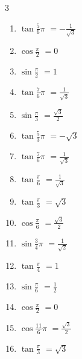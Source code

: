 \begin{multicols}{3}
\begin{enumerate}
  \item $\displaystyle \tan{\frac{5}{6}\pi}$
        $\displaystyle =-\frac{1}{\sqrt{3}}$

  \item $\displaystyle \cos{\frac{\pi}{2}}$
        $\displaystyle =0$

  \item $\displaystyle \sin{\frac{\pi}{2}}$
        $\displaystyle =1$

  \item $\displaystyle \tan{\frac{7}{6}\pi}$
        $\displaystyle =\frac{1}{\sqrt{3}}$

  \item $\displaystyle \sin{\frac{\pi}{3}}$
        $\displaystyle =\frac{\sqrt{3}}{2}$

  \item $\displaystyle \tan{\frac{5}{3}\pi}$
        $\displaystyle =-\sqrt{3}$

  \item $\displaystyle \tan{\frac{7}{6}\pi}$
        $\displaystyle =\frac{1}{\sqrt{3}}$

  \item $\displaystyle \tan{\frac{\pi}{6}}$
        $\displaystyle =\frac{1}{\sqrt{3}}$

  \item $\displaystyle \tan{\frac{\pi}{3}}$
        $\displaystyle =\sqrt{3}$

  \item $\displaystyle \cos{\frac{\pi}{6}}$
        $\displaystyle =\frac{\sqrt{3}}{2}$

\columnbreak %

\resetques

  \item $\displaystyle \sin{\frac{3}{4}\pi}$
        $\displaystyle =\frac{1}{\sqrt{2}}$

  \item $\displaystyle \tan{\frac{\pi}{4}}$
        $\displaystyle =1$

  \item $\displaystyle \sin{\frac{\pi}{6}}$
        $\displaystyle =\frac{1}{2}$

  \item $\displaystyle \cos{\frac{\pi}{2}}$
        $\displaystyle =0$

  \item $\displaystyle \cos{\frac{11}{6}\pi}$
        $\displaystyle =\frac{\sqrt{3}}{2}$

  \item $\displaystyle \tan{\frac{\pi}{3}}$
        $\displaystyle =\sqrt{3}$


\end{enumerate}
\end{multicols}
